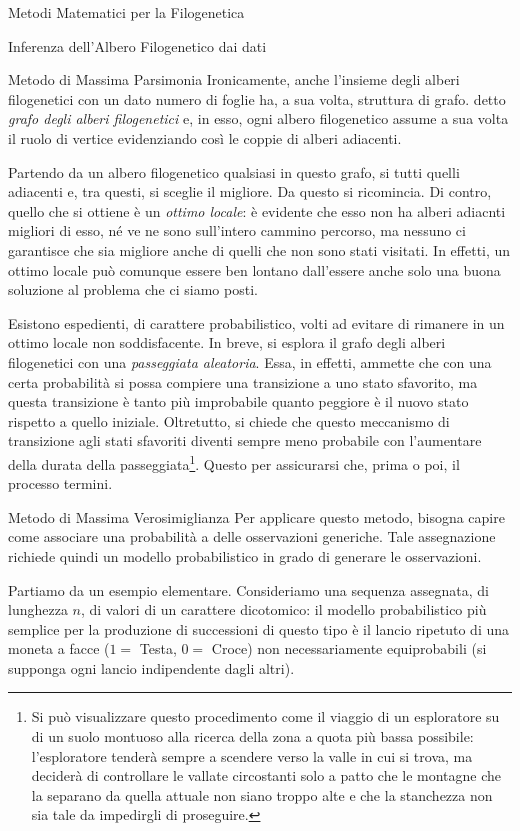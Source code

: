 \documentclass{article}
\begin{document}
\begin{section}{Metodi Matematici per la Filogenetica}
\begin{subsection}{Inferenza dell’Albero Filogenetico dai dati}
\begin{subsubsection}{Metodo di Massima Parsimonia}
				Ironicamente, anche l’insieme degli alberi filogenetici con un dato numero di foglie ha, a sua volta, struttura di grafo. \Egrave detto \emph{grafo degli alberi filogenetici} e, in esso, ogni albero filogenetico assume a sua volta il ruolo di vertice evidenziando così le coppie di alberi adiacenti.
				
				Partendo da un albero filogenetico qualsiasi in questo grafo, si  tutti quelli adiacenti e, tra questi, si sceglie il migliore. Da questo si ricomincia. 
				Di contro, quello che si ottiene è un \emph{ottimo locale}: è evidente che esso non ha alberi adiacnti migliori di esso, né ve ne sono sull'intero cammino percorso, ma nessuno ci garantisce che sia migliore anche di quelli che non sono stati visitati. In effetti, un ottimo locale può comunque essere ben lontano dall’essere anche solo una buona soluzione al problema che ci siamo posti. 
				
				Esistono espedienti, di carattere probabilistico, volti ad evitare di rimanere  in un ottimo locale non soddisfacente. In breve, si esplora il grafo degli alberi filogenetici con una \emph{passeggiata aleatoria}. Essa, in effetti, ammette che con una certa probabilità si possa compiere una transizione a uno stato sfavorito, ma questa transizione è tanto più improbabile quanto peggiore è il nuovo stato rispetto a quello iniziale. Oltretutto, si chiede che questo meccanismo di transizione agli stati sfavoriti diventi sempre meno probabile con l’aumentare della durata della passeggiata\footnote{Si può visualizzare questo procedimento come il viaggio di un esploratore su di un suolo montuoso alla ricerca della zona a quota più bassa possibile: l’esploratore tenderà sempre a scendere verso la valle in cui si trova, ma deciderà di controllare le vallate circostanti solo a patto che le montagne che la separano da quella attuale non siano troppo alte e che la stanchezza non sia tale da impedirgli di proseguire.}. Questo per assicurarsi che, prima o poi, il processo termini.
			\end{subsubsection}
		
			\begin{subsubsection}{Metodo di Massima Verosimiglianza}
				Per applicare questo metodo, bisogna capire come associare una probabilità a delle osservazioni generiche. Tale assegnazione richiede quindi un modello probabilistico in grado di generare le osservazioni.
				
				Partiamo da un esempio elementare. Consideriamo una sequenza assegnata, di lunghezza $n$, di valori di un carattere dicotomico: il modello probabilistico più semplice per la produzione di successioni di questo tipo è il lancio ripetuto di una moneta a facce ($1=$ Testa, $0=$ Croce) non necessariamente equiprobabili (si supponga ogni lancio indipendente dagli altri). 
				

\end{subsubsection}
\end{subsection}
\end{section}
\end{document}
